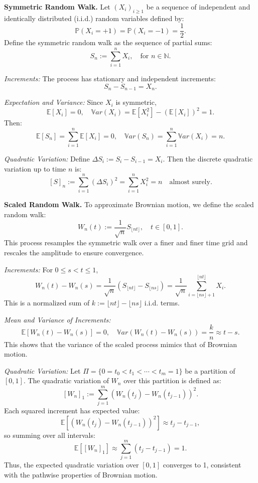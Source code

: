 
\textbf{Symmetric Random Walk.}  
Let \( (X_i)_{i \geq 1} \) be a sequence of independent and identically distributed (i.i.d.) random variables defined by:
\[
\mathbb{P}(X_i = +1) = \mathbb{P}(X_i = -1) = \frac{1}{2}.
\]
Define the symmetric random walk as the sequence of partial sums:
\[
S_n := \sum_{i=1}^n X_i, \quad \text{for } n \in \mathbb{N}.
\]

\textit{Increments:}  
The process has stationary and independent increments:
\[
S_{n} - S_{n-1} = X_n.
\]

\textit{Expectation and Variance:}  
Since \( X_i \) is symmetric,
\[
\mathbb{E}[X_i] = 0, \quad \mathbb{V}ar(X_i) = \mathbb{E}[X_i^2] - (\mathbb{E}[X_i])^2 = 1.
\]
Then:
\[
\mathbb{E}[S_n] = \sum_{i=1}^n \mathbb{E}[X_i] = 0, \quad \mathbb{V}ar(S_n) = \sum_{i=1}^n \mathbb{V}ar(X_i) = n.
\]

\textit{Quadratic Variation:}  
Define \( \Delta S_i := S_i - S_{i-1} = X_i \). Then the discrete quadratic variation up to time \( n \) is:
\[
[S]_n := \sum_{i=1}^n (\Delta S_i)^2 = \sum_{i=1}^n X_i^2 = n \quad \text{almost surely}.
\]

\vspace{1em}
\textbf{Scaled Random Walk.}  
To approximate Brownian motion, we define the scaled random walk:
\[
W_n(t) := \frac{1}{\sqrt{n}} S_{\lfloor nt \rfloor}, \quad t \in [0,1].
\]
This process resamples the symmetric walk over a finer and finer time grid and rescales the amplitude to ensure convergence.

\textit{Increments:}  
For \( 0 \leq s < t \leq 1 \),
\[
W_n(t) - W_n(s) = \frac{1}{\sqrt{n}} \left( S_{\lfloor nt \rfloor} - S_{\lfloor ns \rfloor} \right) = \frac{1}{\sqrt{n}} \sum_{i=\lfloor ns \rfloor + 1}^{\lfloor nt \rfloor} X_i.
\]
This is a normalized sum of \( k := \lfloor nt \rfloor - \lfloor ns \rfloor \) i.i.d. terms.

\textit{Mean and Variance of Increments:}  
\[
\mathbb{E}[W_n(t) - W_n(s)] = 0, \quad \mathbb{V}ar(W_n(t) - W_n(s)) = \frac{k}{n} \approx t - s.
\]
This shows that the variance of the scaled process mimics that of Brownian motion.

\textit{Quadratic Variation:}  
Let \( \Pi = \{0 = t_0 < t_1 < \cdots < t_m = 1\} \) be a partition of \([0,1]\). The quadratic variation of \( W_n \) over this partition is defined as:
\[
[W_n]_1 := \sum_{j=1}^m \left( W_n(t_j) - W_n(t_{j-1}) \right)^2.
\]
Each squared increment has expected value:
\[
\mathbb{E}\left[ \left( W_n(t_j) - W_n(t_{j-1}) \right)^2 \right] \approx t_j - t_{j-1},
\]
so summing over all intervals:
\[
\mathbb{E}[[W_n]_1] \approx \sum_{j=1}^m (t_j - t_{j-1}) = 1.
\]
Thus, the expected quadratic variation over \([0,1]\) converges to 1, consistent with the pathwise properties of Brownian motion.


